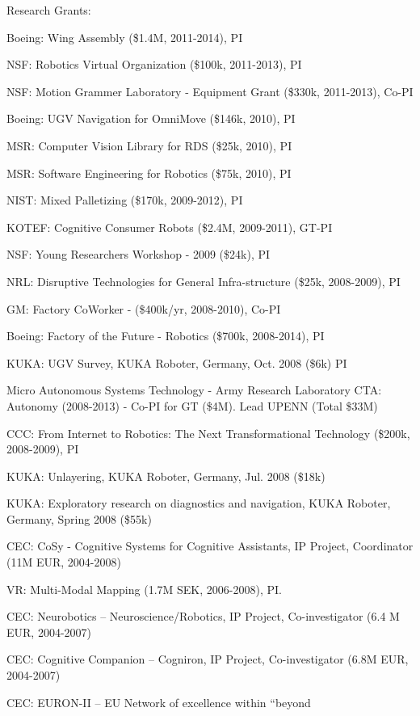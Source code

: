 \documentclass{article}
\begin{document}
\begin{cv}
\begin{cvlist}{Research Grants:}
		\item Boeing: Wing Assembly (\$1.4M, 2011-2014), PI
		\item NSF: Robotics Virtual Organization (\$100k, 2011-2013), PI
		\item NSF: Motion Grammer Laboratory - Equipment Grant (\$330k, 2011-2013), Co-PI
		\item Boeing: UGV Navigation for OmniMove (\$146k, 2010), PI
		\item MSR: Computer Vision Library for RDS (\$25k, 2010), PI
		\item MSR: Software Engineering for Robotics (\$75k, 2010), PI
		\item NIST: Mixed Palletizing (\$170k, 2009-2012), PI
		\item KOTEF: Cognitive Consumer Robots (\$2.4M, 2009-2011), GT-PI
		\item NSF: Young Researchers Workshop - 2009 (\$24k), PI
		\item NRL: Disruptive Technologies for General Infra-structure  (\$25k, 2008-2009), PI
		\item GM: Factory CoWorker - (\$400k/yr, 2008-2010), Co-PI
		\item Boeing: Factory of the Future - Robotics (\$700k, 2008-2014), PI
		\item KUKA: UGV Survey, KUKA Roboter, Germany, Oct. 2008 (\$6k)  PI%
		\item Micro Autonomous Systems Technology - Army Research Laboratory
		CTA: Autonomy (2008-2013) - Co-PI for GT (\$4M). Lead UPENN (Total \$33M) %
		\item CCC: From Internet to Robotics: The Next Transformational
		Technology (\$200k, 2008-2009), PI %
		\item KUKA: Unlayering, KUKA Roboter, Germany, Jul. 2008 (\$18k) %
		\item KUKA: Exploratory research on diagnostics and navigation, KUKA
		Roboter, Germany, Spring 2008 (\$55k)%
		\item CEC: CoSy - Cognitive Systems for Cognitive Assistants, IP
		Project, Coordinator (11M EUR, 2004-2008)
		\item VR: Multi-Modal Mapping (1.7M SEK, 2006-2008), PI.%
		\item CEC: Neurobotics -- Neuroscience/Robotics, IP Project,
		Co-investigator (6.4 M EUR, 2004-2007)%
		\item CEC: Cognitive Companion -- Cogniron, IP Project,
		Co-investigator (6.8M EUR, 2004-2007) %
		\item CEC: EURON-II -- EU Network of excellence within ``beyond

\end{cvlist}
\end{cv}
\end{document}
